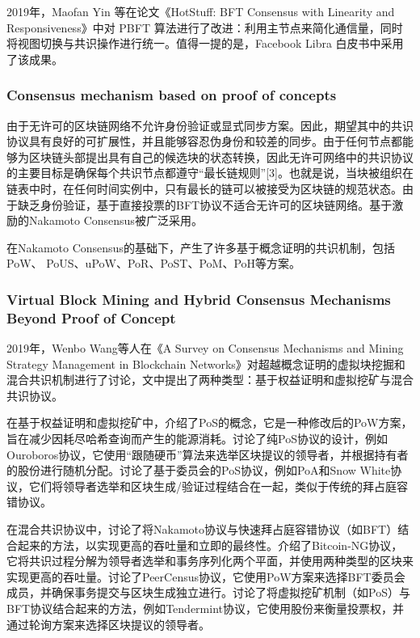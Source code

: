 \documentclass[a4paper,twoside]{scrbook}
\begin{document}
\begin{CJK}{UTF8}{gbsn}
2019年，Maofan Yin 等在论文《HotStuff: BFT Consensus with Linearity and Responsiveness》\cite{yin2019hotstuff}中对 PBFT 算法进行了改进：利用主节点来简化通信量，同时将视图切换与共识操作进行统一。值得一提的是，Facebook Libra 白皮书中采用了该成果。

\subsubsection{Consensus mechanism based on proof of concepts}
由于无许可的区块链网络不允许身份验证或显式同步方案。因此，期望其中的共识协议具有良好的可扩展性，并且能够容忍伪身份和较差的同步。由于任何节点都能够为区块链头部提出具有自己的候选块的状态转换，因此无许可网络中的共识协议的主要目标是确保每个共识节点都遵守“最长链规则”[3]。也就是说，当块被组织在链表中时，在任何时间实例中，只有最长的链可以被接受为区块链的规范状态。由于缺乏身份验证，基于直接投票的BFT协议不适合无许可的区块链网络。基于激励的Nakamoto Consensus\cite{nakamoto2008bitcoin}被广泛采用。

在Nakamoto Consensus的基础下，产生了许多基于概念证明的共识机制，包括PoW、
PoUS、uPoW、PoR、PoST、PoM、PoH等方案。

\subsubsection{Virtual Block Mining and Hybrid Consensus Mechanisms Beyond Proof of Concept}
2019年，Wenbo Wang等人在《A Survey on Consensus Mechanisms and Mining Strategy Management in Blockchain Networks》\cite{wang2019survey}对超越概念证明的虚拟块挖掘和混合共识机制进行了讨论，文中提出了两种类型：基于权益证明和虚拟挖矿与混合共识协议。

在基于权益证明和虚拟挖矿中，介绍了PoS的概念，它是一种修改后的PoW方案，旨在减少因耗尽哈希查询而产生的能源消耗。讨论了纯PoS协议的设计，例如Ouroboros协议，它使用“跟随硬币”算法来选举区块提议的领导者，并根据持有者的股份进行随机分配。讨论了基于委员会的PoS协议，例如PoA和Snow White协议，它们将领导者选举和区块生成/验证过程结合在一起，类似于传统的拜占庭容错协议。

在混合共识协议中，讨论了将Nakamoto协议与快速拜占庭容错协议（如BFT）结合起来的方法，以实现更高的吞吐量和立即的最终性。介绍了Bitcoin-NG协议，它将共识过程分解为领导者选举和事务序列化两个平面，并使用两种类型的区块来实现更高的吞吐量。讨论了PeerCensus协议，它使用PoW方案来选择BFT委员会成员，并确保事务提交与区块生成独立进行。讨论了将虚拟挖矿机制（如PoS）与BFT协议结合起来的方法，例如Tendermint协议，它使用股份来衡量投票权，并通过轮询方案来选择区块提议的领导者。


\end{CJK}
\end{document}
